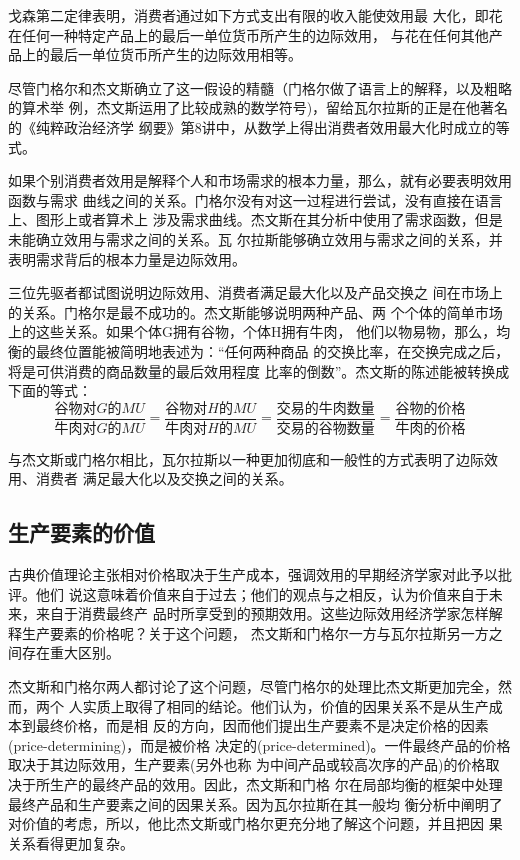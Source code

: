 戈森第二定律表明，消费者通过如下方式支出有限的收入能使效用最
大化，即花在任何一种特定产品上的最后一单位货币所产生的边际效用，
与花在任何其他产品上的最后一单位货币所产生的边际效用相等。

尽管门格尔和杰文斯确立了这一假设的精髓（门格尔做了语言上的解释，以及粗略的算术举
例，杰文斯运用了比较成熟的数学符号)，留给瓦尔拉斯的正是在他著名的《纯粹政治经济学
纲要》第8讲中，从数学上得出消费者效用最大化时成立的等式。

如果个别消费者效用是解释个人和市场需求的根本力量，那么，就有必要表明效用函数与需求
曲线之间的关系。门格尔没有对这一过程进行尝试，没有直接在语言上、图形上或者算术上
涉及需求曲线。杰文斯在其分析中使用了需求函数，但是未能确立效用与需求之间的关系。瓦
尔拉斯能够确立效用与需求之间的关系，并表明需求背后的根本力量是边际效用。

三位先驱者都试图说明边际效用、消费者满足最大化以及产品交换之
间在市场上的关系。门格尔是最不成功的。杰文斯能够说明两种产品、两
个个体的简单市场上的这些关系。如果个体G拥有谷物，个体H拥有牛肉，
他们以物易物，那么，均衡的最终位置能被简明地表述为：“任何两种商品
的交换比率，在交换完成之后，将是可供消费的商品数量的最后效用程度
比率的倒数”。杰文斯的陈述能被转换成下面的等式：
\[ \frac{谷物对G的MU}{牛肉对G的MU} = \frac{谷物对H的MU}{牛肉对H的MU} = \frac{交
    易的牛肉数量}{交易的谷物数量} = \frac{谷物的价格}{牛肉的价格} \]

与杰文斯或门格尔相比，瓦尔拉斯以一种更加彻底和一般性的方式表明了边际效用、消费者
满足最大化以及交换之间的关系。

\subsection{生产要素的价值}

古典价值理论主张相对价格取决于生产成本，强调效用的早期经济学家对此予以批评。他们
说这意味着价值来自于过去；他们的观点与之相反，认为价值来自于未来，来自于消费最终产
品时所享受到的预期效用。这些边际效用经济学家怎样解释生产要素的价格呢？关于这个问题，
杰文斯和门格尔一方与瓦尔拉斯另一方之间存在重大区别。

杰文斯和门格尔两人都讨论了这个问题，尽管门格尔的处理比杰文斯更加完全，然而，两个
人实质上取得了相同的结论。他们认为，价值的因果关系不是从生产成本到最终价格，而是相
反的方向，因而他们提出生产要素不是决定价格的因素(price-determining)，而是被价格
决定的(price-determined)。一件最终产品的价格取决于其边际效用，生产要素(另外也称
为中间产品或较高次序的产品)的价格取决于所生产的最终产品的效用。因此，杰文斯和门格
尔在局部均衡的框架中处理最终产品和生产要素之间的因果关系。因为瓦尔拉斯在其一般均
衡分析中阐明了对价值的考虑，所以，他比杰文斯或门格尔更充分地了解这个问题，并且把因
果关系看得更加复杂。

